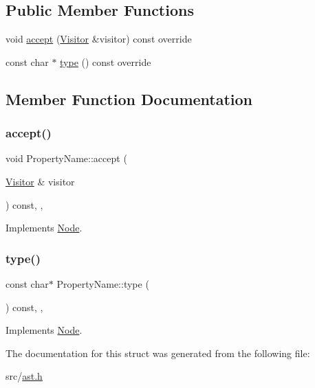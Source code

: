 \subsection*{Public Member Functions}
\begin{DoxyCompactItemize}
\item 
void \hyperlink{struct_property_name_a95857be8c40022cf788e3b11aa70cdc7}{accept} (\hyperlink{struct_visitor}{Visitor} \&visitor) const override
\item 
const char $\ast$ \hyperlink{struct_property_name_af0476e4cc00bc4ac43adab1050bf1bbd}{type} () const override
\end{DoxyCompactItemize}


\subsection{Member Function Documentation}
\mbox{\label{struct_property_name_a95857be8c40022cf788e3b11aa70cdc7}} 
\subsubsection{\texorpdfstring{accept()}{accept()}}
{\footnotesize\ttfamily void Property\+Name\+::accept (\begin{DoxyParamCaption}\item[{\hyperlink{struct_visitor}{Visitor} \&}]{visitor }\end{DoxyParamCaption}) const\hspace{0.3cm}{\ttfamily [inline]}, {\ttfamily [override]}, {\ttfamily [virtual]}}



Implements \hyperlink{struct_node_a10bd7af968140bbf5fa461298a969c71}{Node}.

\mbox{\label{struct_property_name_af0476e4cc00bc4ac43adab1050bf1bbd}} 
\subsubsection{\texorpdfstring{type()}{type()}}
{\footnotesize\ttfamily const char$\ast$ Property\+Name\+::type (\begin{DoxyParamCaption}{ }\end{DoxyParamCaption}) const\hspace{0.3cm}{\ttfamily [inline]}, {\ttfamily [override]}, {\ttfamily [virtual]}}



Implements \hyperlink{struct_node_a82f29420d0a38efcc370352528e94e9b}{Node}.



The documentation for this struct was generated from the following file\+:\begin{DoxyCompactItemize}
\item 
src/\hyperlink{ast_8h}{ast.\+h}\end{DoxyCompactItemize}
